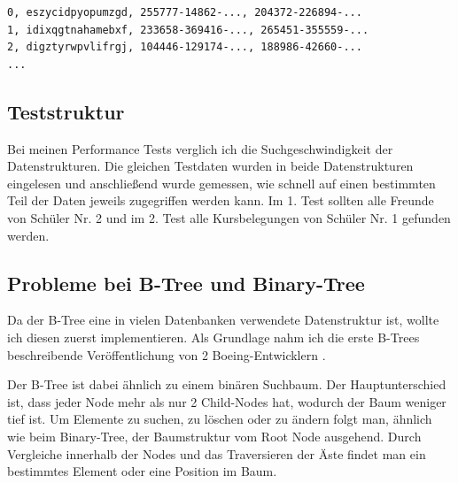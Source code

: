 \documentclass[11pt,a4paper]{article}
\begin{document}
\begin{lstlisting}
0, eszycidpyopumzgd, 255777-14862-..., 204372-226894-...
1, idixqgtnahamebxf, 233658-369416-..., 265451-355559-...
2, digztyrwpvlifrgj, 104446-129174-..., 188986-42660-...
...
\end{lstlisting}


\subsection{Teststruktur}

Bei meinen Performance Tests verglich ich die Suchgeschwindigkeit der Datenstrukturen.
Die gleichen Testdaten wurden in beide Datenstrukturen eingelesen und anschließend
wurde gemessen, wie schnell auf einen bestimmten Teil der Daten jeweils zugegriffen
werden kann. Im 1. Test sollten alle Freunde von Schüler Nr. 2 und im 2. Test alle
Kursbelegungen von Schüler Nr. 1 gefunden werden.

\subsection{Probleme bei B-Tree und Binary-Tree}

Da der B-Tree eine in vielen Datenbanken verwendete Datenstruktur ist, wollte ich
diesen zuerst implementieren. Als Grundlage nahm ich die erste B-Trees beschreibende
Veröffentlichung von 2 Boeing-Entwicklern \cite{boeing_engineers}.

\vspace*{0.3cm}

Der B-Tree ist dabei ähnlich zu einem binären Suchbaum.
Der Hauptunterschied ist, dass jeder Node mehr als nur 2 Child-Nodes
hat, wodurch der Baum weniger tief ist.
Um Elemente zu suchen, zu löschen oder zu ändern folgt man, ähnlich wie beim
Binary-Tree, der Baumstruktur vom Root Node ausgehend.
Durch Vergleiche innerhalb der Nodes und das Traversieren der
Äste findet man ein bestimmtes Element oder eine Position im Baum.
\end{document}
